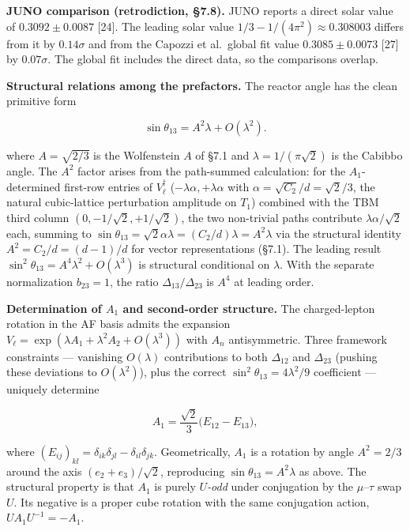 \documentclass[
]{article}
\begin{document}
\textbf{JUNO comparison (retrodiction, §7.8).} JUNO reports a direct
solar value of \(0.3092\pm0.0087\) {[}24{]}. The leading solar value
\(1/3-1/(4\pi^2)\approx0.308003\) differs from it by \(0.14\sigma\) and
from the Capozzi et al.~global fit value \(0.3085\pm0.0073\) {[}27{]} by
\(0.07\sigma\). The global fit includes the direct data, so the
comparisons overlap.

\textbf{Structural relations among the prefactors.} The reactor angle
has the clean primitive form

\[\sin\theta_{13} = A^2 \lambda + O(\lambda^2).\]

where \(A = \sqrt{2/3}\) is the Wolfenstein \(A\) of §7.1 and
\(\lambda = 1/(\pi\sqrt{2})\) is the Cabibbo angle. The \(A^2\) factor
arises from the path-summed calculation: for the \(A_1\)-determined
first-row entries of \(V_\ell^\dagger\)
(\(-\lambda\alpha, +\lambda\alpha\) with
\(\alpha = \sqrt{C_2}/d = \sqrt 2/3\), the natural cubic-lattice
perturbation amplitude on \(T_1\)) combined with the TBM third column
\((0, -1/\sqrt 2, +1/\sqrt 2)\), the two non-trivial paths contribute
\(\lambda\alpha/\sqrt 2\) each, summing to
\(\sin\theta_{13} = \sqrt{2}\alpha\lambda = (C_2/d)\lambda = A^2 \lambda\)
via the structural identity \(A^2 = C_2/d = (d-1)/d\) for vector
representations (§7.1). The leading result
\(\sin^2\theta_{13}=A^4\lambda^2+O(\lambda^3)\) is structural
conditional on \(\lambda\). With the separate normalization
\(b_{23}=1\), the ratio \(\Delta_{13}/\Delta_{23}\) is \(A^4\) at
leading order.

\textbf{Determination of \(A_1\) and second-order structure.} The
charged-lepton rotation in the AF basis admits the expansion
\(V_\ell = \exp(\lambda A_1 + \lambda^2 A_2 + O(\lambda^3))\) with
\(A_n\) antisymmetric. Three framework constraints --- vanishing
\(O(\lambda)\) contributions to both \(\Delta_{12}\) and \(\Delta_{23}\)
(pushing these deviations to \(O(\lambda^2)\)), plus the correct
\(\sin^2\theta_{13} = 4\lambda^2/9\) coefficient --- uniquely determine

\[A_1 = \frac{\sqrt{2}}{3}\big(E_{12} - E_{13}\big),\]

where
\((E_{ij})_{kl} = \delta_{ik}\delta_{jl} - \delta_{il}\delta_{jk}\).
Geometrically, \(A_1\) is a rotation by angle \(A^2 = 2/3\) around the
axis \((e_2 + e_3)/\sqrt{2}\), reproducing
\(\sin\theta_{13} = A^2\lambda\) as above. The structural property is
that \(A_1\) is purely \emph{\(U\)-odd} under conjugation by the
\(\mu\)--\(\tau\) swap \(U\). Its negative is a proper cube rotation
with the same conjugation action, \(U A_1 U^{-1}=-A_1\).
\end{document}
